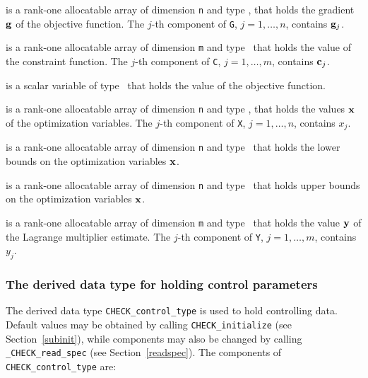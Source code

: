 \documentclass{galahad}
\newcommand{\packagename}{CHECK}
\newcommand{\fullpackagename}{\libraryname\_\packagename}
\begin{document}
\begin{description}
 is a rank-one allocatable array of dimension {\tt n} and type 
\realdp, that holds the gradient ${\mathbf{g}}$ 
of the objective function.
The $j$-th component of 
{\tt G}, $j = 1,  \ldots ,  n$, contains ${\mathbf{g}}_{j}$.

 is a rank-one allocatable array of dimension {\tt m} and type 
\realdp\ that holds the value of the constraint function.
The $j$-th component of {\tt C}, $j = 1, \ldots , m$, contains ${\mathbf{c}}_{j}$.

 is a scalar variable of type 
\realdp\ that holds the value of the objective function.

 is a rank-one allocatable array of dimension {\tt n} and type 
\realdp, 
that holds the values ${\mathbf{x}}$ of the optimization variables.
The $j$-th component of {\tt X}, $j = 1,  \ldots , n$, contains
$x_{j}$.

 is a rank-one allocatable array of dimension {\tt n} and type 
\realdp\ 
that holds the lower bounds on the optimization variables ${\mathbf{x}}$.

 is a rank-one allocatable array of dimension {\tt n} and type 
\realdp\ 
that holds upper  bounds on the optimization variables ${\mathbf{x}}$.

 is a rank-one allocatable array of dimension {\tt m} and type 
\realdp\ 
that holds the value ${\mathbf{y}}$ of the Lagrange multiplier estimate.
The $j$-th component of {\tt Y}, $j = 1,  \ldots , m$, contains
$y_{j}$.  

\end{description}


\subsubsection{The derived data type for holding control 
 parameters}\label{typecontrol}
The derived data type 
{\tt \packagename\_control\_type} 
is used to hold controlling data. Default values may be obtained by calling 
{\tt \packagename\_initialize}
(see Section~\ref{subinit}),
while components may also be changed by calling 
{\tt \fullpackagename\_read\-\_spec}
(see Section~\ref{readspec}). 
The components of 
{\tt \packagename\_control\_type} 
are:
\end{document}
